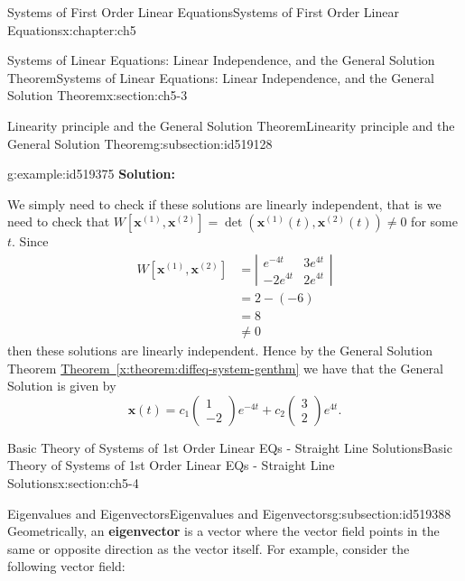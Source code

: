 \documentclass[oneside,10pt,]{book}
\newcommand{\xreffont}{\relax}
\newcommand{\terminology}[1]{\textbf{#1}}
\numberwithin{equation}{section}
\numberwithin{equation}{section}
\newcommand{\amp}{&}
\begin{document}
\begin{chapterptx}{Systems of First Order Linear Equations}{}{Systems of First Order Linear Equations}{}{}{x:chapter:ch5}
\begin{sectionptx}{Systems of Linear Equations: Linear Independence, and the General Solution Theorem}{}{Systems of Linear Equations: Linear Independence, and the General Solution Theorem}{}{}{x:section:ch5-3}
\begin{subsectionptx}{Linearity principle and the General Solution Theorem}{}{Linearity principle and the General Solution Theorem}{}{}{g:subsection:id519128}
\begin{example}{}{g:example:id519375}
\terminology{Solution:}%
\par
We simply need to check if these solutions are linearly independent, that is we need to check that \(W\left[\mathbf{x}^{(1)},\mathbf{x}^{(2)}\right]=\det\left(\mathbf{x}^{(1)}(t),\mathbf{x}^{(2)}(t)\right)\neq0\) for some \(t\). Since%
\begin{align*}
W\left[\mathbf{x}^{(1)},\mathbf{x}^{(2)}\right] \amp =\left|\begin{array}{cc}
e^{-4t} \amp 3e^{4t}\\
-2e^{4t} \amp 2e^{4t}
\end{array}\right|\\
\amp =2-(-6)\\
\amp =8\\
\amp \neq 0 
\end{align*}
then these solutions are linearly independent. Hence by the General Solution Theorem \hyperref[x:theorem:diffeq-system-genthm]{Theorem~{\xreffont\ref{x:theorem:diffeq-system-genthm}}} we have that the General Solution is given by%
\begin{equation*}
\mathbf{x}(t)=c_{1}\left(\begin{array}{c}
1\\
-2
\end{array}\right)e^{-4t}+c_{2}\left(\begin{array}{c}
3\\
2
\end{array}\right)e^{4t}.
\end{equation*}
%
\end{example}
\end{subsectionptx}
\end{sectionptx}
%
%
\typeout{************************************************}
\typeout{************************************************}
%
\begin{sectionptx}{Basic Theory of Systems of 1st Order Linear EQs - Straight Line Solutions}{}{Basic Theory of Systems of 1st Order Linear EQs - Straight Line Solutions}{}{}{x:section:ch5-4}
%
%
\typeout{************************************************}
\typeout{************************************************}
%
\begin{subsectionptx}{Eigenvalues and Eigenvectors}{}{Eigenvalues and Eigenvectors}{}{}{g:subsection:id519388}
Geometrically, an \terminology{eigenvector} is a vector where the vector field points in the same or opposite direction as the vector itself. For example, consider the following vector field:%

\end{subsectionptx}
\end{sectionptx}
\end{chapterptx}
\end{document}
